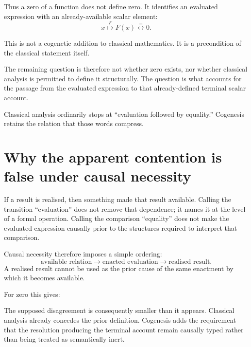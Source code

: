 \documentclass[11pt]{article}
\begin{document}
Thus a zero of a function does not define zero. It identifies an evaluated expression with an already-available scalar element:
\[
x
\overset{F}{\longmapsto}
F(x)
\overset{=}{\longleftrightarrow}
0.
\]

This is not a cogenetic addition to classical mathematics. It is a precondition of the classical statement itself.

\medskip
\noindent
{}
\medskip

The remaining question is therefore not whether zero exists, nor whether classical analysis is permitted to define it structurally. The question is what accounts for the passage from the evaluated expression to that already-defined terminal scalar account.

Classical analysis ordinarily stops at ``evaluation followed by equality.'' Cogenesis retains the relation that those words compress.

\section{Why the apparent contention is false under causal necessity}

If a result is realised, then something made that result available. Calling the transition ``evaluation'' does not remove that dependence; it names it at the level of a formal operation. Calling the comparison ``equality'' does not make the evaluated expression causally prior to the structures required to interpret that comparison.

Causal necessity therefore imposes a simple ordering:
\[
\text{available relation}
\longrightarrow
\text{enacted evaluation}
\longrightarrow
\text{realised result}.
\]
A realised result cannot be used as the prior cause of the same enactment by which it becomes available.

For zero this gives:

\medskip
\noindent
{}
\medskip

The supposed disagreement is consequently smaller than it appears. Classical analysis already concedes the prior definition. Cogenesis adds the requirement that the resolution producing the terminal account remain causally typed rather than being treated as semantically inert.
\end{document}
